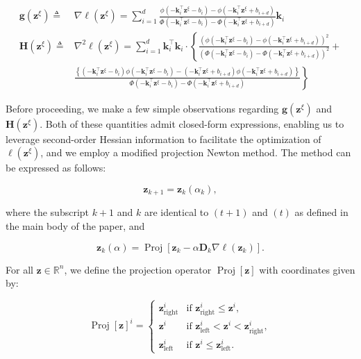 \documentclass{article}
\theoremstyle{plain}
\theoremstyle{definition}
\def \H {\mathbf{H}}
\def \g {\mathbf{g}}
\def \H {\mathbf{H}}
\def \g {\mathbf{g}}
\def \H {\mathbf{H}}
\def \D {\mathbf{D}}
\def \z {\mathbf{z}}
\begin{document}
\begin{equation}
  \label{eq:gradient-hessian}
\begin{aligned}
\mathbf{g}\left(\mathbf{z}^{\xi}\right)\triangleq & \nabla \ell\left(\mathbf{z}^{\xi}\right)=\sum_{i=1}^d \frac{\phi\left(-\mathbf{k}_i^{\top} \mathbf{z}^{\xi}-b_i\right)-\phi\left(-\mathbf{k}_i^{\top} \mathbf{z}^{\xi}+b_{i+d}\right)}{\Phi\left(-\mathbf{k}_i^{\top} \mathbf{z}^{\xi}-b_i\right)-\Phi\left(-\mathbf{k}_i^{\top} \mathbf{z}^{\xi}+b_{i+d}\right)} \mathbf{k}_i \\
\mathbf{H}\left(\mathbf{z}^{\xi}\right)\triangleq&\nabla^2\ell\left(\mathbf{z}^{\xi}\right)=  \sum_{i=1}^d \mathbf{k}_i^{\top} \mathbf{k}_i \cdot\left\{\frac{\left(\phi\left(-\mathbf{k}_i^{\top} \mathbf{z}^{\xi}-b_i\right)-\phi\left(-\mathbf{k}_i^{\top} \mathbf{z}^{\xi}+b_{i+d}\right)\right)^2}{\left(\Phi\left(-\mathbf{k}_i^{\top} \mathbf{z}^{\xi}-b_i\right)-\Phi\left(-\mathbf{k}_i^{\top} \mathbf{z}^{\xi}+b_{i+d}\right)\right)^2}+\right. \\
& \left.\frac{\left\{\left(-\mathbf{k}_i^{\top} \mathbf{z}^{\xi}-b_i\right) \phi\left(-\mathbf{k}_i^{\top} \mathbf{z}^{\xi}-b_i\right)-\left(-\mathbf{k}_i^{\top} \mathbf{z}^{\xi}+b_{i+d}\right) \phi\left(-\mathbf{k}_i^{\top} \mathbf{z}^{\xi}+b_{i+d}\right)\right\}}{\Phi\left(-\mathbf{k}_i^{\top} \mathbf{z}^{\xi}-b_i\right)-\Phi\left(-\mathbf{k}_i^{\top} \mathbf{z}^{\xi}+b_{i+d}\right)}\right\}
\end{aligned}
\end{equation}

Before proceeding, we make a few simple observations regarding \(\g(\z^\xi)\) and \(\H(\z^\xi)\). Both of these quantities admit closed-form expressions, enabling us to leverage second-order Hessian information to facilitate the optimization of \(\ell(\z^\xi)\), and we employ a modified projection Newton method. The method can be expressed as follows:


\[
    \z_{k+1} = \z_k(\alpha_k),
\]

where the subscript $k+1$ and $k$ are identical to $(t+1)$ and $(t)$ as defined in the main body of the paper, and

\[
    \z_k(\alpha) = \operatorname{Proj}\left[\z_k - \alpha \D_k \nabla \ell\left(\z_k\right)\right].
\]

For all $\z \in \mathbb{R}^n$, we define the projection operator $\operatorname{Proj}[\z]$ with coordinates given by:

\[
    \operatorname{Proj}[\z]^i = 
    \begin{cases} 
      \z_{\operatorname{right}}^i & \text{if } \z_{\operatorname{right}}^i \leq \z^i, \\
      \z^i & \text{if } \z_{\operatorname{left}}^i < \z^i < \z_{\operatorname{right}}^i, \\
      \z_{\operatorname{left}}^i & \text{if } \z^i \leq \z_{\operatorname{left}}^i.
    \end{cases}
\]
\end{document}
